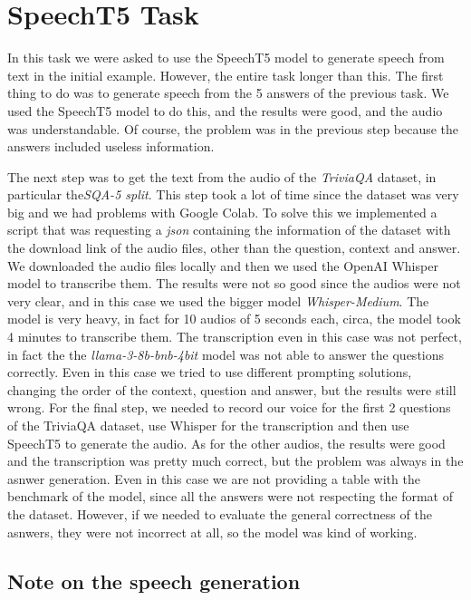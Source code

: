 \documentclass{Interspeech2024}
\begin{document}
\section{SpeechT5 Task}
In this task we were asked to use the SpeechT5 model to generate speech from text in the initial example.
However, the entire task longer than this. The first thing 
to do was to generate speech from the 5 answers of the previous 
task. We used the SpeechT5 model to do this, and the results
were good, and the audio was understandable. Of course, the problem was in the 
previous step because the answers included useless information.

The next step was to get the text from the audio of the \textit{TriviaQA} dataset, in particular
the\textit{SQA-5 split}.
This step took a lot of time since the dataset was 
very big and we had problems with Google Colab. To solve this we implemented 
a script that was requesting a \textit{json} containing the information 
of the dataset with the download link of the audio files, 
other than the question, context and answer. We downloaded the 
audio files locally and then we used the OpenAI Whisper model to
transcribe them. The results were not so good since the audios 
were not very clear, and in this case we used the bigger model
\textit{Whisper-Medium}. The model is very heavy, in fact for 
10 audios of 5 seconds each, circa, the model took 4 minutes to 
transcribe them. The transcription even in this case 
was not perfect, in fact the the \textit{llama-3-8b-bnb-4bit} model
was not able to answer the questions correctly. Even in this case
we tried to use different prompting solutions,
changing the order of the context, question and answer, but the results were still wrong.
For the final step, we needed to record our voice for the first 2
questions of the TriviaQA dataset, use Whisper for the transcription
and then use SpeechT5 to generate the audio. As for the other 
audios, the results were good and the transcription was
pretty much correct, but the problem was always in the asnwer 
generation. Even in this case we are not providing a table with the 
benchmark of the model, since all the answers were not respecting 
the format of the dataset. However, if we needed to 
evaluate the general correctness of the asnwers, they were
not incorrect at all, so the model was kind of working.

\subsection{Note on the speech generation}
\end{document}
